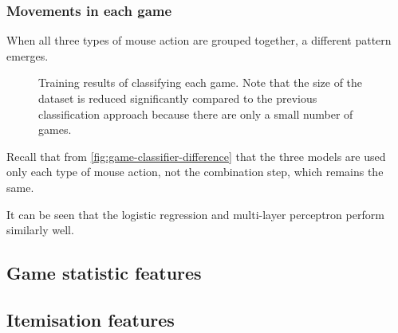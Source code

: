 \documentclass[Report.tex]{subfiles}
\newcommand{\newaxis}[4]{
\begin{axis}[
    ybar,
    title={#1},
    ymin=#3, ymax=#4,
    bar width=1em,
    legend style={at={(0.5,-0.25)},anchor=north,legend columns=-1},
    enlarge x limits=0.4,
    x tick label style={align=center,text width=1.7cm},
    symbolic x coords={Logistic Regression, Random Forest, Multi-layer Perceptron},
    xtick=data,
    ylabel={#2}
]
}
\begin{document}
\subsubsection{Movements in each game}\label{sbsec:game-classification}
When all three types of mouse action are grouped together, a different pattern emerges. 
\begin{figure}[H]
\centering
{}
\caption{Training results of classifying each game. Note that the size of the dataset is reduced significantly compared to the previous classification approach because there are only a small number of games.}
\end{figure}

Recall that from \ref{fig:game-classifier-difference} that the three models are used only each type of mouse action, not the combination step, which remains the same. 

It can be seen that the logistic regression and multi-layer perceptron perform similarly well. 






\subsection{Game statistic features}

\subsection{Itemisation features}
\end{document}
